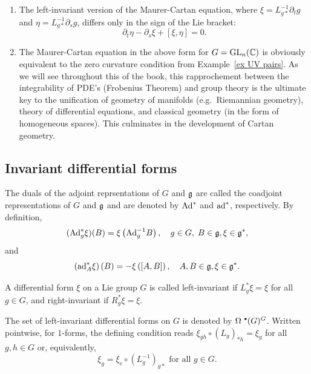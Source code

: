 \begin{rem}
    \begin{enumerate}
        \item The left-invariant version of the Maurer-Cartan equation, where $\xi=L_{g\ast}^{-1}\partial_t g$ and $\eta =L_{g\ast}^{-1}\partial_s g$, differs only in the sign of the Lie bracket: 
        \[\partial_t\eta-\partial_s\xi+[\xi,\eta]=0.\label{eq Maurer-Cartan left xi eta}\]
        \item The Maurer-Cartan equation in the above form for $G=\operatorname{GL}_n(\mathbb{C})$ is obviously equivalent to the zero curvature condition from Example~\ref{ex UV pairs}. As we will see throughout this \partt{} of the book, this rapprochement between the integrability of PDE's (Frobenius Theorem) and group theory is the ultimate key to the unification of geometry of manifolds (e.g.\ Riemannian geometry), theory of differential equations, and classical geometry (in the form of homogeneous spaces). This culminates in the development of Cartan geometry.
    \end{enumerate}
\end{rem}










\subsection{Invariant differential forms}\label{subsec: invariant diff forms}

\begin{defn}
    The duals of the adjoint reprsentations of $G$ and $\mathfrak{g}$ are called the coadjoint representations of $G$ and $\mathfrak{g}$ and are denoted by $\mathrm{Ad}^\ast$ and $\mathrm{ad}^\ast$, respectively. By definition,
    \[(\mathrm{Ad}^\ast_g \xi)(B)=\xi\left(\mathrm{Ad}_g^{-1}B\right),\quad  g\in G,\;B\in\mathfrak{g},\xi\in\mathfrak{g}^\ast,\]
    and 
    \[\left(\mathrm{ad}_A^\ast \xi\right)(B)=-\xi\left([A,B]\right),\quad A,B\in\mathfrak{g},\xi\in\mathfrak{g}^\ast.\]
\end{defn}


\begin{defn}
    A differential form $\xi$ on a Lie group $G$ is called left-invariant if $L_g^\ast\xi =\xi $ for all $g\in G$, and right-invariant if $R_g^\ast\xi=\xi$.

    The set of left-invariant differential forms on $G$ is denoted by $\Omega^{\smbullet }(G)^G$. Written pointwise, for $1$-forms, the defining condition reads $\xi_{gh}\circ (L_g)_{\ast h}=\xi_g$ for all $g,h\in G$ or, equivalently,
    \[\xi_g=\xi_e\circ (L_{g}^{-1})_{g\ast}\text{ for all }g\in G.\label{eq 5.5.1 RS1}\]
\end{defn}

